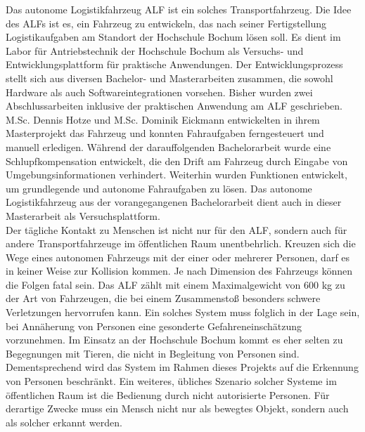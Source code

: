 		Das autonome Logistikfahrzeug ALF ist ein solches Transportfahrzeug. Die Idee des ALFs ist es, ein Fahrzeug zu entwickeln, das nach seiner Fertigstellung Logistikaufgaben am Standort der Hochschule Bochum lösen soll. Es dient im Labor für Antriebstechnik der Hochschule Bochum als Versuchs- und Entwicklungsplattform für praktische Anwendungen. Der Entwicklungsprozess stellt sich aus diversen Bachelor- und Masterarbeiten zusammen, die sowohl Hardware als auch Softwareintegrationen vorsehen. Bisher wurden zwei Abschlussarbeiten inklusive der praktischen Anwendung am ALF geschrieben. M.Sc. Dennis Hotze und M.Sc. Dominik Eickmann entwickelten in ihrem Masterprojekt das Fahrzeug und konnten Fahraufgaben ferngesteuert und manuell erledigen. Während der darauffolgenden Bachelorarbeit wurde eine Schlupfkompensation entwickelt, die den Drift am Fahrzeug durch Eingabe von Umgebungsinformationen verhindert. Weiterhin wurden Funktionen entwickelt, um grundlegende und autonome Fahraufgaben zu lösen. Das autonome Logistikfahrzeug aus der vorangegangenen Bachelorarbeit dient auch in dieser Masterarbeit als Versuchsplattform.\\
		
		Der tägliche Kontakt zu Menschen ist nicht nur für den ALF, sondern auch für andere Transportfahrzeuge im öffentlichen Raum unentbehrlich. Kreuzen sich die Wege eines autonomen Fahrzeugs mit der einer oder mehrerer Personen, darf es in keiner Weise zur Kollision kommen. Je nach Dimension des Fahrzeugs können die Folgen fatal sein. Das ALF zählt mit einem Maximalgewicht von 600 kg zu der Art von Fahrzeugen, die bei einem Zusammenstoß besonders schwere Verletzungen hervorrufen kann. Ein solches System muss folglich in der Lage sein, bei Annäherung von Personen eine gesonderte Gefahreneinschätzung vorzunehmen. Im Einsatz an der Hochschule Bochum kommt es eher selten zu Begegnungen mit Tieren, die nicht in Begleitung von Personen sind. Dementsprechend wird das System im Rahmen dieses Projekts auf die Erkennung von Personen beschränkt. Ein weiteres, übliches Szenario solcher Systeme im öffentlichen Raum ist die Bedienung durch nicht autorisierte Personen. Für derartige Zwecke muss ein Mensch nicht nur als bewegtes Objekt, sondern auch als solcher erkannt werden. \\
		
